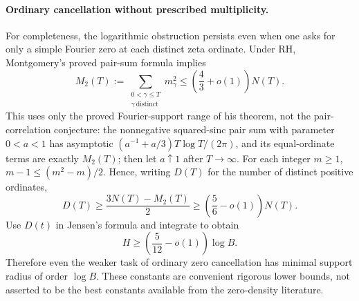 \paragraph{Ordinary cancellation without prescribed multiplicity.}
For completeness, the logarithmic obstruction persists even when one
asks for only a simple Fourier zero at each distinct zeta ordinate.
Under RH, Montgomery's proved pair-sum formula \cite{Montgomery,CGG} implies
\[
 M_2(T):=\sum_{\substack{0<\gamma\le T\\\gamma\ {\text{distinct}}}}m_\gamma^2
 \le\left(\frac43+o(1)\right)N(T).
\]
This uses only the proved Fourier-support range of his theorem,
not the pair-correlation conjecture: the nonnegative squared-sinc
pair sum with parameter $0<a<1$ has asymptotic
$(a^{-1}+a/3)T\log T/(2\pi)$, and its equal-ordinate terms are exactly
$M_2(T)$; then let $a\uparrow1$ after $T\to\infty$.
For each integer $m\ge1$, $m-1\le(m^2-m)/2$. Hence, writing $D(T)$
for the number of distinct positive ordinates,
\[
 D(T)\ge\frac{3N(T)-M_2(T)}2
       \ge\left(\frac56-o(1)\right)N(T).
\]
Use $D(t)$ in Jensen's formula and integrate to obtain
\begin{equation}\label{eq:distinct-support-lower}
 H\ge\left(\frac5{12}-o(1)\right)\log B.
\end{equation}
Therefore even the weaker task of ordinary zero cancellation has
minimal support radius of order $\log B$. These constants are
convenient rigorous lower bounds, not asserted to be the best
constants available from the zero-density literature.

